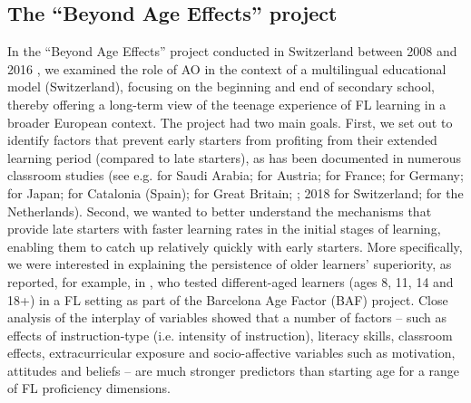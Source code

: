 \documentclass[output=paper,modfonts,nonflat,newtxmath]{langsci/langscibook}
\begin{document}
\subsection{{The} {“Beyond} {Age} {Effects”} {project}}
\label{sec:pfenninger:2.1.}

In the “Beyond Age Effects” project conducted in Switzerland between 2008 and 2016 \citep{Pfenninger2017}, we examined the role of AO in the context of a multilingual educational model (Switzerland), focusing on the beginning and end of secondary school, thereby offering a long-term view of the teenage experience of FL learning in a broader European context. The project had two main goals. First, we set out to identify factors that prevent early starters from profiting from their extended learning period (compared to late starters), as has been documented in numerous classroom studies (see e.g. \citealt{Al-Thubaiti2010} for Saudi Arabia; \citealt{Buchholz2007} for Austria; \citealt{Genelot1997} for France; \citealt{JaekelEtAl2017} for Germany; \citealt{Larson-Hall2008} for Japan; \citealt{Muñoz2006} for Catalonia (Spain); \citealt{GrahamEtAl2017} for Great Britain; \citealt{Pfenninger2017}; 2018 for Switzerland; \citealt{UnsworthEtAl2015} for the Netherlands). Second, we wanted to better understand the mechanisms that provide late starters with faster learning rates in the initial stages of learning, enabling them to catch up relatively quickly with early starters. More specifically, we were interested in explaining the persistence of older learners’ superiority, as reported, for example, in \citet{Muñoz2006}, who tested different-aged learners (ages 8, 11, 14 and 18+) in a FL setting as part of the Barcelona Age Factor (BAF) project. Close analysis of the interplay of variables showed that a number of factors – such as effects of instruction-type (i.e. intensity of instruction), literacy skills, classroom effects, extracurricular exposure and socio-affective variables such as motivation, attitudes and beliefs – are much stronger predictors than starting age for a range of FL proficiency dimensions.
\end{document}
